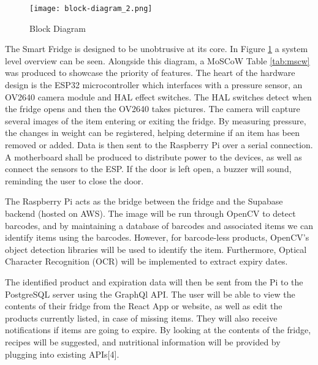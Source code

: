 \begin{figure}[H]        
    \centering
    \caption{Block Diagram}
    \label{fig:block_diagram}
    \texttt{[image: block-diagram\_2.png]}
\end{figure} 

The Smart Fridge is designed to be unobtrusive at its core.
In Figure \ref{fig:block_diagram} a system level overview can be seen.
Alongside this diagram, a MoSCoW Table \ref{tab:mscw} was produced to showcase the priority of features.
The heart of the hardware design is the ESP32 microcontroller which interfaces with a pressure sensor,
an OV2640 camera module and HAL effect switches.
The HAL switches detect when the fridge opens and then the OV2640 takes pictures.
The camera will capture several images of the item entering or exiting the fridge.
By measuring pressure, the changes in weight can be registered, helping determine if an item has been removed or added.
Data is then sent to the Raspberry Pi over a serial connection.
A motherboard shall be produced to distribute power to the devices,
as well as connect the sensors to the ESP.
If the door is left open, a buzzer will sound, reminding the user to close the door.  

The Raspberry Pi acts as the bridge between the fridge and the Supabase backend (hosted on AWS).
The image will be run through OpenCV to detect barcodes,
and by maintaining a database of barcodes and associated items we can identify items using the barcodes.
However, for barcode-less products, OpenCV's object detection libraries will be used to identify the item.
Furthermore, Optical Character Recognition (OCR) will be implemented to extract expiry dates.  

The identified product and expiration data will then be sent from the Pi to the PostgreSQL server using the GraphQl API.
The user will be able to view the contents of their fridge from the React App or website,
as well as edit the products currently listed, in case of missing items.
They will also receive notifications if items are going to expire.
By looking at the contents of the fridge, recipes will be suggested, and nutritional information will be provided by plugging into existing APIs[4].  


